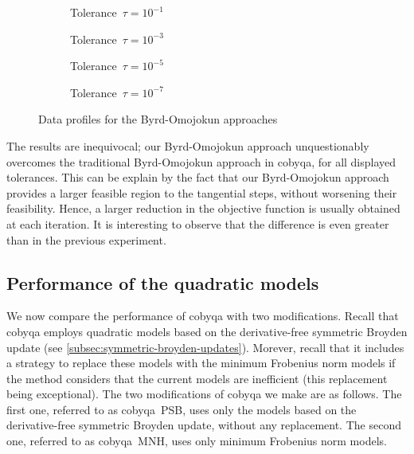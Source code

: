 \begin{figure}[ht]
    \centering
    \begin{subfigure}[b]{0.49\textwidth}
        \centering
        \caption{Tolerance~$\tau = 10^{-1}$}
    \end{subfigure}
    \hfill
    \begin{subfigure}[b]{0.49\textwidth}
        \centering
        \caption{Tolerance~$\tau = 10^{-3}$}
    \end{subfigure}
    \begin{subfigure}[b]{0.49\textwidth}
        \centering
        \caption{Tolerance~$\tau = 10^{-5}$}
    \end{subfigure}
    \hfill
    \begin{subfigure}[b]{0.49\textwidth}
        \centering
        \caption{Tolerance~$\tau = 10^{-7}$}
    \end{subfigure}
    \caption{Data profiles for the Byrd-Omojokun approaches}
    \label{fig:data-byrd-omojokun}
\end{figure}

The results are inequivocal; our Byrd-Omojokun approach unquestionably overcomes the traditional Byrd-Omojokun approach in \gls{cobyqa}, for all displayed tolerances.
This can be explain by the fact that our Byrd-Omojokun approach provides a larger feasible region to the tangential steps, without worsening their feasibility.
Hence, a larger reduction in the objective function is usually obtained at each iteration.
It is interesting to observe that the difference is even greater than in the previous experiment.

\subsection{Performance of the quadratic models}
\label{subsec:alternative-models}

We now compare the performance of \gls{cobyqa} with two modifications.
Recall that \gls{cobyqa} employs quadratic models based on the derivative-free symmetric Broyden update (see \cref{subsec:symmetric-broyden-updates}).
Morever, recall that it includes a strategy to replace these models with the minimum Frobenius norm models if the method considers that the current models are inefficient (this replacement being exceptional).
The two modifications of \gls{cobyqa} we make are as follows.
The first one, referred to as \gls{cobyqa}~PSB, uses only the models based on the derivative-free symmetric Broyden update, without any replacement.
The second one, referred to as \gls{cobyqa}~MNH, uses only minimum Frobenius norm models.


